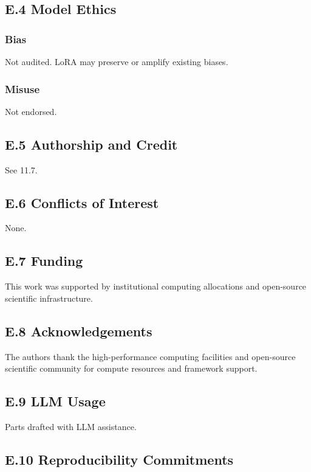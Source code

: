 \subsection{E.4 Model Ethics}

\subsubsection{Bias}
Not audited. LoRA may preserve or amplify existing biases.

\subsubsection{Misuse}
Not endorsed.

\subsection{E.5 Authorship and Credit}

See  11.7.

\subsection{E.6 Conflicts of Interest}

None.

\subsection{E.7 Funding}

This work was supported by institutional computing allocations and open-source scientific infrastructure.

\subsection{E.8 Acknowledgements}

The authors thank the high-performance computing facilities and open-source scientific community for compute resources and framework support.

\subsection{E.9 LLM Usage}

Parts drafted with LLM assistance.

\subsection{E.10 Reproducibility Commitments}


